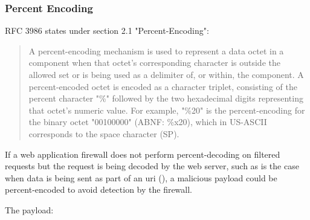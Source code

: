 

\subsubsection{Percent Encoding}
\label{sec:percenc}
RFC 3986 states under section 2.1 "Percent-Encoding":
\begin{quote}
	A percent-encoding mechanism is used to represent a data octet in a
	component when that octet's corresponding character is outside the
	allowed set or is being used as a delimiter of, or within, the
	component.  A percent-encoded octet is encoded as a character
	triplet, consisting of the percent character "\%" followed by the two
	hexadecimal digits representing that octet's numeric value.  For
	example, "\%20" is the percent-encoding for the binary octet
	"00100000" (ABNF: \%x20), which in US-ASCII corresponds to the space
	character (SP). \cite{rfc3986}
\end{quote}
If a web application firewall does not perform percent-decoding on filtered requests but the request is being decoded by the web server, such as is the case when data is being sent as part of an \acrshort{uri} (\cite{rfc3986/sec2.4}), a malicious payload could be percent-encoded to avoid detection by the firewall.

The payload:

